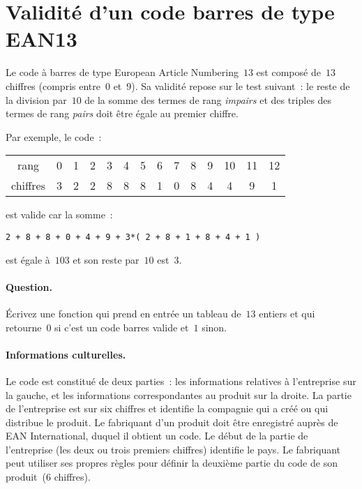 \section{Validit\'e d'un code barres de type EAN13}
Le code \`a barres de type European Article Numbering~$13$ est
compos\'e de~$13$ chiffres (compris entre~$0$ et~$9$).  Sa validit\'e
repose sur le test suivant~: le reste de la division par~$10$ de la
somme des termes de rang \emph{impairs} et des triples des termes de
rang \emph{pairs} doit \^etre \'egale au premier chiffre.
\par
Par exemple, le code~:
\par
\begin{center}
  \begin{tabular}{cccccccccccccc}
    rang & 0 & 1 & 2 & 3 &4 &5 &6 &7 &8 & 9 & 10 & 11 & 12  \\
    chiffres & 3& 2& 2& 8& 8& 8& 1& 0& 8& 4& 4& 9& 1
  \end{tabular}
\end{center}
\par
est valide car la somme~:
\begin{verbatim}
2 + 8 + 8 + 0 + 4 + 9 + 3*( 2 + 8 + 1 + 8 + 4 + 1 )
\end{verbatim}
est \'egale \`a~$103$ et son reste par~$10$ est~$3$.
\paragraph{Question.}
\'Ecrivez  une fonction  qui prend   en  entr\'ee un  tableau  de~$13$
entiers  et  qui retourne~$0$  si c'est  un code  barres valide et~$1$
sinon.
\paragraph{Informations culturelles.}
Le code est constitu\'e de  deux parties~: les informations  relatives
\`a l'entreprise sur la gauche, et les informations correspondantes au
produit sur la droite. La partie de  l'entreprise est sur six chiffres
et identifie la compagnie qui a cr\'e\'e  ou qui distribue le produit. 
Le fabriquant   d'un produit doit être    enregistr\'e aupr\`es de EAN
International, duquel il obtient un code.  Le d\'ebut  de la partie de
l'entreprise (les deux ou trois  premiers chiffres) identifie le pays. 
Le   fabriquant peut utiliser  ses  propres r\`egles pour d\'efinir la
deuxi\`eme partie du code de son produit~($6$ chiffres).
